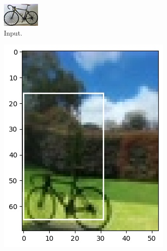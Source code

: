 \documentclass[11pt]{article}
\theoremstyle{definition}
\theoremstyle{remark}
\theoremstyle{remark}
\theoremstyle{remark}
\begin{document}
\begin{figure}[H]
  \centering
  \begin{subfigure}[b]{0.32\textwidth}
    \centering \includegraphics[width=\textwidth]{figs/input4.jpg}
    \caption{Input.}
  \end{subfigure}
  \begin{subfigure}[b]{0.32\textwidth}
    \centering \includegraphics[width=\textwidth]{figs/0-4-0-test_case1.jpg}

\end{subfigure}
\end{figure}
\end{document}
